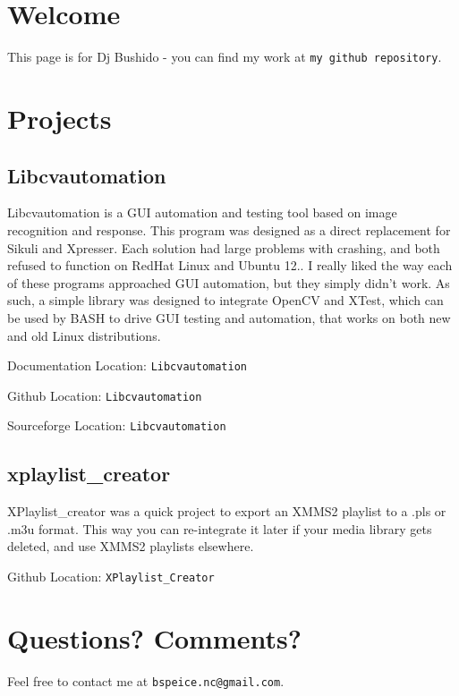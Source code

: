\section{\-Welcome}\label{index_welcome}
\-This page is for \-Dj \-Bushido -\/ you can find my work at {\tt my github repository}. \section{\-Projects}\label{index_projects}
\subsection{\-Libcvautomation}\label{index_libcvautomation}
\-Libcvautomation is a \-G\-U\-I automation and testing tool based on image recognition and response. \-This program was designed as a direct replacement for \-Sikuli and \-Xpresser. \-Each solution had large problems with crashing, and both refused to function on \-Red\-Hat \-Linux and \-Ubuntu 12.. \-I really liked the way each of these programs approached \-G\-U\-I automation, but they simply didn't work. \-As such, a simple library was designed to integrate \-Open\-C\-V and \-X\-Test, which can be used by \-B\-A\-S\-H to drive \-G\-U\-I testing and automation, that works on both new and old \-Linux distributions.

\-Documentation \-Location\-: {\tt \-Libcvautomation}

\-Github \-Location\-: {\tt \-Libcvautomation}

\-Sourceforge \-Location\-: {\tt \-Libcvautomation}\subsection{xplaylist\-\_\-creator}\label{index_xplaylistcreator}
\-X\-Playlist\-\_\-creator was a quick project to export an \-X\-M\-M\-S2 playlist to a .pls or .m3u format. \-This way you can re-\/integrate it later if your media library gets deleted, and use \-X\-M\-M\-S2 playlists elsewhere.

\-Github \-Location\-: {\tt \-X\-Playlist\-\_\-\-Creator}\section{\-Questions? Comments?}\label{index_questions}
\-Feel free to contact me at {\tt bspeice.\-nc@gmail.\-com}. 